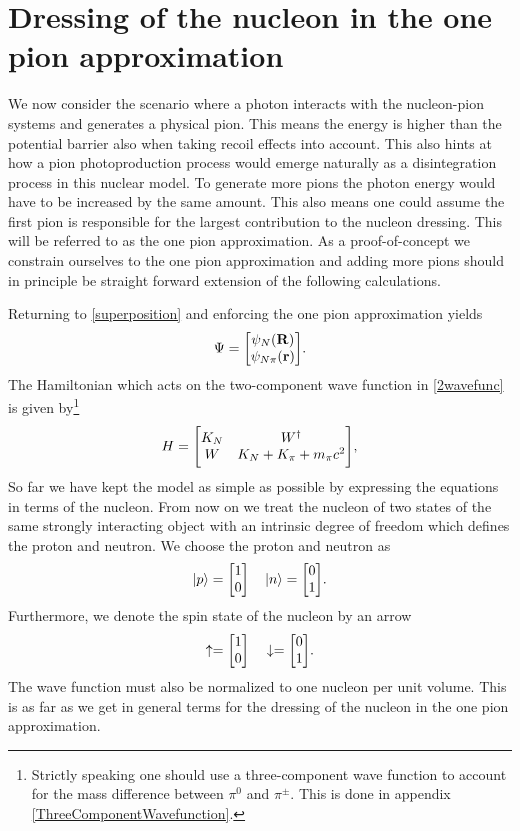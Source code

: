 \section{Dressing of the nucleon in the one pion approximation}\label{dressnuc}
We now consider the scenario where a photon interacts with the nucleon-pion systems and generates a physical pion. This means the energy is higher than the potential barrier also when taking recoil effects into account. This also hints at how a pion photoproduction process would emerge naturally as a disintegration process in this nuclear model. To generate more pions the photon energy would have to be increased by the same amount. This also means one could assume the first pion is responsible for the largest contribution to the nucleon dressing.  This will be referred to as the one pion approximation.  As a proof-of-concept we constrain ourselves to the one pion approximation and adding more pions should in principle be straight forward extension of the following calculations.

Returning to \eqref{superposition} and enforcing the one pion approximation yields
\begin{equation} \label{2wavefunc}
	\Psi = \mqty[\psi_{N}(\vec{R})\\
	\psi_{N\pi}(\vec{r})].
\end{equation}
The Hamiltonian which acts on the two-component wave function in \eqref{2wavefunc} is given by\footnote{Strictly speaking one should use a three-component wave function to account for the mass difference between $\pi^0$ and $\pi^\pm$. This is done in appendix \ref{ThreeComponentWavefunction}.}
\begin{equation}\label{HamilTwo}
	H  =  \mqty[K_N & W^\dagger \\ W & K_N+K_\pi+m_\pi c^2],
\end{equation}
So far we have kept the model as simple as possible by expressing the equations in terms of the nucleon. From now on we treat the nucleon of two states of the same strongly interacting object with an intrinsic degree of freedom which defines the proton and neutron. We choose the proton and neutron as 
\begin{equation} \label{isospinvec}
	\ket{p} = \mqty[1 \\ 0 ] \quad \ket{n} = \mqty[0 \\ 1].
\end{equation} 
Furthermore, we denote the spin state of the nucleon by an arrow
\begin{equation} \label{spinvec}
	\uparrow = \mqty[1 \\ 0 ] \quad  \downarrow= \mqty[0 \\ 1].
\end{equation}
The wave function must also be normalized to one nucleon per unit volume. This is as far as we get in general terms for the dressing of the nucleon in the one pion approximation.
